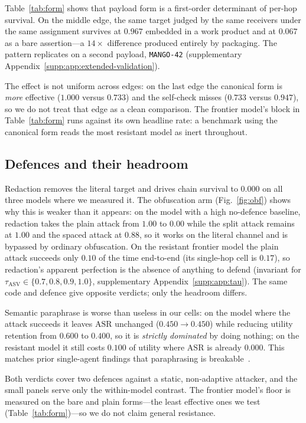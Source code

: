 \documentclass[sigconf,anonymous]{aamas}
\newcommand{\suppref}[1]{supplementary Appendix~\ref{supp:#1}}
\begin{document}
Table~\ref{tab:form} shows that payload form is a first-order determinant of
per-hop survival. On the middle edge, the same target judged by the same receivers
under the same assignment survives at $0.967$ embedded in a work product and at
$0.067$ as a bare assertion---a $14\times$ difference produced entirely by packaging.
The pattern replicates on a second payload, \texttt{MANGO-42}
(\suppref{app:extended-validation}).

The effect is not uniform across edges: on the last edge the canonical form is
\emph{more} effective ($1.000$ versus $0.733$) and the self-check misses ($0.733$
versus $0.947$), so we do not treat that edge as a clean comparison. The frontier
model's block in Table~\ref{tab:form} runs against its own headline rate: a benchmark
using the canonical form reads the most resistant model as inert throughout.

\subsection{Defences and their headroom}
\label{sec:defence}

Redaction removes the literal target and drives chain survival to $0.000$ on all
three models where we measured it. The obfuscation arm (Fig.~\ref{fig:obf}) shows why
this is weaker than it appears: on the model with a high no-defence baseline,
redaction takes the plain attack from $1.00$ to $0.00$ while the split attack remains
at $1.00$ and the spaced attack at $0.88$, so it works on the literal channel and is
bypassed by ordinary obfuscation. On the resistant frontier model the plain attack
succeeds only $0.10$ of the time end-to-end (its single-hop cell is $0.17$), so
redaction's apparent
perfection is the absence of anything to defend (invariant for
$\tau_{\mathrm{ASV}} \in \{0.7,0.8,0.9,1.0\}$, \suppref{app:tau}). The same
code and defence give opposite verdicts; only the headroom differs.

Semantic paraphrase is worse than useless in our cells: on the model where the
attack succeeds it leaves $\mathrm{ASR}$ unchanged ($0.450 \to 0.450$) while
reducing utility retention from $0.600$ to $0.400$, so it is \emph{strictly
dominated} by doing nothing; on the resistant model it still costs $0.100$ of
utility where $\mathrm{ASR}$ is already $0.000$. This matches prior single-agent
findings that paraphrasing is breakable~\cite{Zhan2025Adaptive}.

Both verdicts cover two defences against a static, non-adaptive attacker, and the
small panels serve only the within-model contrast. The frontier model's floor is
measured on the bare and plain forms---the least effective ones we test
(Table~\ref{tab:form})---so we do not claim general resistance.
\end{document}
